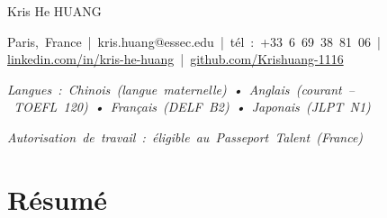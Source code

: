 \documentclass[10pt, letterpaper]{article}
\newenvironment{header}{
    \setlength{\topsep}{0pt}\par\kern\topsep\centering\linespread{1.2}
}{
    \par\kern\topsep
} %
\let\hrefWithoutArrow\href
\begin{document}
    \newcommand{\AND}{\unskip
        \cleaders\copy\ANDbox\hskip\wd\ANDbox
        \ignorespaces
    }
    \newsavebox\ANDbox
    \sbox\ANDbox{$|$}

    \begin{header}
        \fontsize{25 pt}{25 pt}\selectfont Kris He HUANG

        \vspace{5 pt}

        \normalsize
        \mbox{Paris, France} \,|\,
        \mbox{kris.huang@essec.edu} \,|\,
        \mbox{tél : +33 6 69 38 81 06} \,|\,
        \mbox{\hrefWithoutArrow{https://www.linkedin.com/in/kris-he-huang}{linkedin.com/in/kris-he-huang}} \,|\,
        \mbox{\hrefWithoutArrow{https://github.com/Krishuang-1116}{github.com/Krishuang-1116}}

        \vspace{3 pt}

        \mbox{\textit{Langues : Chinois (langue maternelle) • Anglais (courant – TOEFL 120) • Français (DELF B2) • Japonais (JLPT N1)}}

        \vspace{3 pt}

        \mbox{\textit{Autorisation de travail : éligible au Passeport Talent (France)}}
    \end{header}

    \vspace{2 pt - 0.2 cm}


    \section{Résumé}
\end{document}
